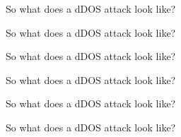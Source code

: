 \documentclass{beamer}
\begin{document}
\begin{frame}{So what does a dDOS attack look like?}
  \begin{center}
    
  \end{center}
\end{frame}
\begin{frame}[noframenumbering]{So what does a dDOS attack look like?}
  \begin{center}
    
  \end{center}
\end{frame}
\begin{frame}[noframenumbering]{So what does a dDOS attack look like?}
  \begin{center}
    
  \end{center}
\end{frame}
\begin{frame}[noframenumbering]{So what does a dDOS attack look like?}
  \begin{center}
    
  \end{center}
\end{frame}
\begin{frame}[noframenumbering]{So what does a dDOS attack look like?}
  \begin{center}
    
  \end{center}
\end{frame}
\begin{frame}[noframenumbering]{So what does a dDOS attack look like?}
  \begin{center}
    
  \end{center}
\end{frame}
\end{document}
